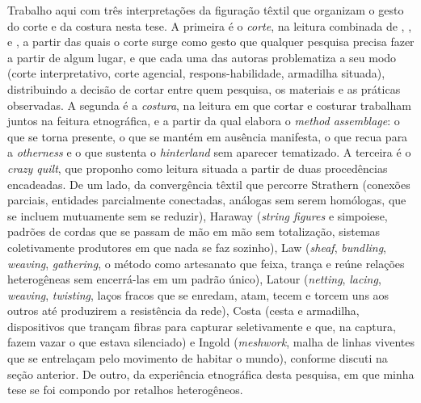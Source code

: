 Trabalho aqui com três interpretações da figuração têxtil que organizam o gesto do corte e da costura nesta tese. A primeira é o \textit{corte}, na leitura combinada de \textcite{strathern2011cortando}, \textcite{Barad2007Meeting}, \textcite{Haraway2023Ficar} e \textcite{costa2024manchando}, a partir das quais o corte surge como gesto que qualquer pesquisa precisa fazer a partir de algum lugar, e que cada uma das autoras problematiza a seu modo (corte interpretativo, corte agencial, respons-habilidade, armadilha situada), distribuindo a decisão de cortar entre quem pesquisa, os materiais e as práticas observadas. A segunda é a \textit{costura}, na leitura em que cortar e costurar trabalham juntos na feitura etnográfica, e a partir da qual \textcite{Law2004After} elabora o \textit{method assemblage}: o que se torna presente, o que se mantém em ausência manifesta, o que recua para a \textit{otherness} e o que sustenta o \textit{hinterland} sem aparecer tematizado. A terceira é o \textit{crazy quilt}, que proponho como leitura situada a partir de duas procedências encadeadas. De um lado, da convergência têxtil que percorre Strathern (conexões parciais, entidades parcialmente conectadas, análogas sem serem homólogas, que se incluem mutuamente sem se reduzir), Haraway (\textit{string figures} e simpoiese, padrões de cordas que se passam de mão em mão sem totalização, sistemas coletivamente produtores em que nada se faz sozinho), Law (\textit{sheaf}, \textit{bundling}, \textit{weaving}, \textit{gathering}, o método como artesanato que feixa, trança e reúne relações heterogêneas sem encerrá-las em um padrão único), Latour (\textit{netting}, \textit{lacing}, \textit{weaving}, \textit{twisting}, laços fracos que se enredam, atam, tecem e torcem uns aos outros até produzirem a resistência da rede), Costa (cesta e armadilha, dispositivos que trançam fibras para capturar seletivamente e que, na captura, fazem vazar o que estava silenciado) e Ingold (\textit{meshwork}, malha de linhas viventes que se entrelaçam pelo movimento de habitar o mundo), conforme discuti na seção anterior. De outro, da experiência etnográfica desta pesquisa, em que minha tese se foi compondo por retalhos heterogêneos.

